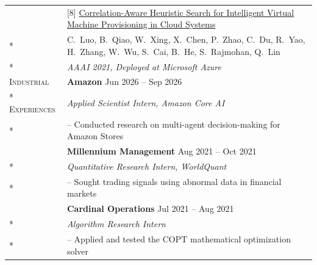 \documentclass[letterpaper, 10pt]{article}
\newcommand{\cvsection}[1]{\nohyphens{\scshape #1}}
\newlength{\entrysep}   \setlength{\entrysep}{5pt}
\newlength{\sectionsep} \setlength{\sectionsep}{12pt}
\begin{document}
\begin{longtable}{p{}p{5.8in}}
& [8] \href{https://ojs.aaai.org/index.php/AAAI/article/view/17467}{Correlation-Aware Heuristic Search for Intelligent Virtual Machine Provisioning in Cloud Systems} \\*
& C.~Luo, B.~Qiao, W.~Xing, X.~Chen, P.~Zhao, C.~Du, R.~Yao, H.~Zhang, W.~Wu, S.~Cai, B.~He, S.~Rajmohan, Q.~Lin \\*
& \textit{AAAI 2021, Deployed at Microsoft Azure} \\[\sectionsep]


%


\cvsection{Industrial}
& \textbf{Amazon} \hfill Jun 2026 -- Sep 2026 \\*
\cvsection{Experiences}
& \textit{Applied Scientist Intern, Amazon Core AI} \\*
& -- Conducted research on multi-agent decision-making for Amazon Stores \\[\entrysep]

& \textbf{Millennium Management} \hfill Aug 2021 -- Oct 2021 \\*
& \textit{Quantitative Research Intern, WorldQuant} \\*
& -- Sought trading signals using abnormal data in financial markets \\[\entrysep]

& \textbf{Cardinal Operations} \hfill Jul 2021 -- Aug 2021 \\*
& \textit{Algorithm Research Intern} \\*
& -- Applied and tested the COPT mathematical optimization solver \\[\entrysep]


\end{longtable}
\end{document}
